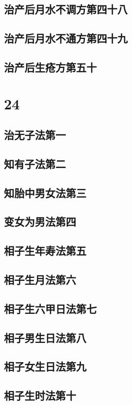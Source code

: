 \documentclass[a4paper,12pt,UTF8,twoside]{ctexbook}
\begin{document}
\chapter{治产后月水不调方第四十八}
\chapter{治产后月水不通方第四十九}
\chapter{治产后生疮方第五十}

\part{24}
\chapter{治无子法第一}
\chapter{知有子法第二}
\chapter{知胎中男女法第三}
\chapter{变女为男法第四}
\chapter{相子生年寿法第五}
\chapter{相子生月法第六}
\chapter{相子生六甲日法第七}
\chapter{相子男生日法第八}
\chapter{相子女生日法第九}
\chapter{相子生时法第十}
\end{document}
